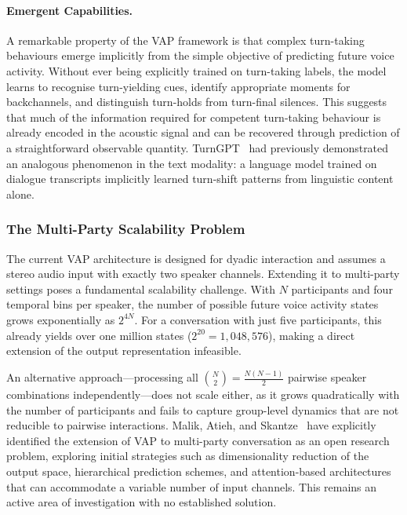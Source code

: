 \paragraph{Emergent Capabilities.}
A remarkable property of the VAP framework is that complex turn-taking behaviours emerge implicitly from the simple objective of predicting future voice activity. Without ever being explicitly trained on turn-taking labels, the model learns to recognise turn-yielding cues, identify appropriate moments for backchannels, and distinguish turn-holds from turn-final silences. This suggests that much of the information required for competent turn-taking behaviour is already encoded in the acoustic signal and can be recovered through prediction of a straightforward observable quantity. TurnGPT~\cite{ekstedt2020turngpt} had previously demonstrated an analogous phenomenon in the text modality: a language model trained on dialogue transcripts implicitly learned turn-shift patterns from linguistic content alone.

\subsubsection{The Multi-Party Scalability Problem}

The current VAP architecture is designed for dyadic interaction and assumes a stereo audio input with exactly two speaker channels. Extending it to multi-party settings poses a fundamental scalability challenge. With $N$ participants and four temporal bins per speaker, the number of possible future voice activity states grows exponentially as $2^{4N}$. For a conversation with just five participants, this already yields over one million states ($2^{20} = 1{,}048{,}576$), making a direct extension of the output representation infeasible.

An alternative approach---processing all $\binom{N}{2} = \frac{N(N-1)}{2}$ pairwise speaker combinations independently---does not scale either, as it grows quadratically with the number of participants and fails to capture group-level dynamics that are not reducible to pairwise interactions. Malik, Atieh, and Skantze~\cite{malik2024vap} have explicitly identified the extension of VAP to multi-party conversation as an open research problem, exploring initial strategies such as dimensionality reduction of the output space, hierarchical prediction schemes, and attention-based architectures that can accommodate a variable number of input channels. This remains an active area of investigation with no established solution.

